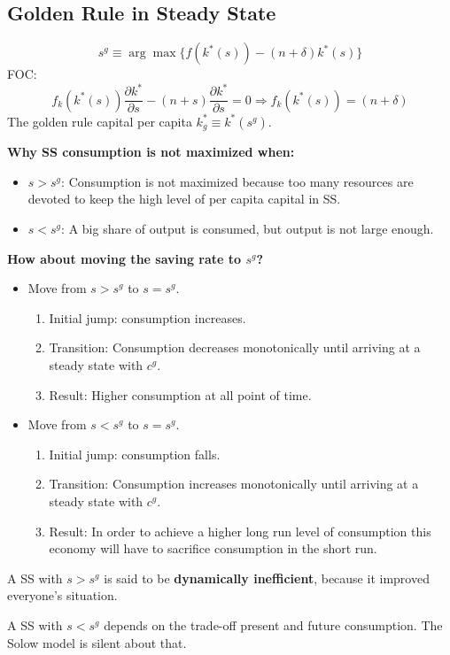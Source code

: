 \subsection{Golden Rule in Steady State} \[
    s^g \equiv \arg \max\{f(k^*(s)) - (n+\delta)k^*(s)\}
\]
FOC: \[
    f_k(k^*(s))\frac{\partial k^*}{\partial s} - (n+s)\frac{\partial k^*}{\partial s} = 0 \Longrightarrow f_k(k^*(s)) = (n+\delta)
\]
The golden rule capital per capita $k^*_g \equiv k^*(s^g)$.

\textbf{Why SS consumption is not maximized when:} \begin{itemize}
    \item $s>s^g$: Consumption is not maximized because too many resources are devoted to keep the high level of per capita capital in SS.
    \item $s<s^g$: A big share of output is consumed, but output is not large enough.
\end{itemize}

\textbf{How about moving the saving rate to $s^g$?} \begin{itemize}
    \item Move from $s > s^g$ to $s = s^g$. \begin{enumerate}
              \item Initial jump: consumption increases.
              \item Transition: Consumption decreases monotonically until arriving at a steady state with $c^g$.
              \item Result: Higher consumption at all point of time.
          \end{enumerate}
    \item Move from $s < s^g$ to $s = s^g$. \begin{enumerate}
              \item Initial jump: consumption falls.
              \item Transition: Consumption increases monotonically until arriving at a steady state with $c^g$.
              \item Result: In order to achieve a higher long run level of consumption this economy will have to sacrifice consumption in the short run.
          \end{enumerate}
\end{itemize}

A SS with $s > s^g$ is said to be \textbf{dynamically inefficient}, because it improved everyone's situation.

A SS with $s < s^g$ depends on the trade-off present and future consumption. The Solow model is silent about that.


